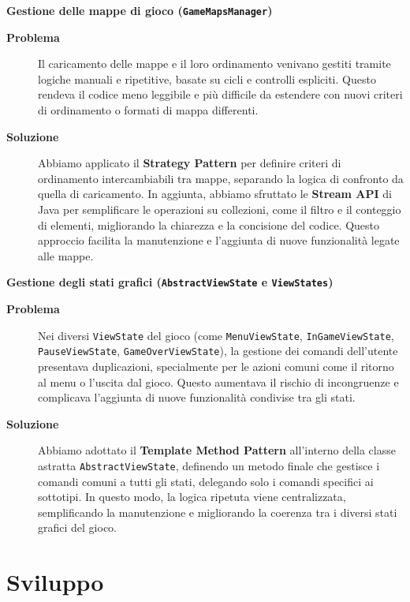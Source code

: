 \documentclass[a4paper,12pt]{report}
\begin{document}
\noindent
\textbf{Gestione delle mappe di gioco (\texttt{GameMapsManager})}
\begin{description}
	\item[\textbf{Problema}]
	      Il caricamento delle mappe e il loro ordinamento venivano gestiti tramite logiche manuali e ripetitive, basate su cicli e controlli espliciti. Questo rendeva il codice meno
	      leggibile e più difficile da estendere con nuovi criteri di ordinamento o formati di mappa differenti.

	\item[\textbf{Soluzione}]
	      Abbiamo applicato il \textbf{Strategy Pattern} per definire criteri di ordinamento intercambiabili tra mappe, separando la logica di confronto da quella di caricamento. In
	      aggiunta, abbiamo sfruttato le \textbf{Stream API} di Java per semplificare le operazioni su collezioni, come il filtro e il conteggio di elementi, migliorando la chiarezza e la concisione
	      del codice. Questo approccio facilita la manutenzione e l'aggiunta di nuove funzionalità legate alle mappe.
\end{description}

\noindent
\textbf{Gestione degli stati grafici (\texttt{AbstractViewState} e \texttt{ViewStates})}
\begin{description}
	\item[\textbf{Problema}]
	      Nei diversi \texttt{ViewState} del gioco (come \texttt{MenuViewState}, \newline \texttt{InGameViewState}, \texttt{PauseViewState}, \texttt{GameOverViewState}), la gestione dei comandi dell'utente
	      presentava duplicazioni, specialmente per le azioni comuni come il ritorno al menu o l'uscita dal gioco. Questo aumentava il rischio di incongruenze e complicava l'aggiunta di nuove
	      funzionalità condivise tra gli stati.

	\item[\textbf{Soluzione}]
	      Abbiamo adottato il \textbf{Template Method Pattern} all'interno della classe astratta \texttt{AbstractViewState}, definendo un metodo finale che gestisce i comandi comuni a tutti gli stati, 
	      delegando solo i comandi specifici ai sottotipi. In questo modo, la logica ripetuta viene centralizzata, semplificando la manutenzione e migliorando la coerenza tra i diversi stati grafici del gioco.
\end{description}

\chapter{Sviluppo}
\end{document}
